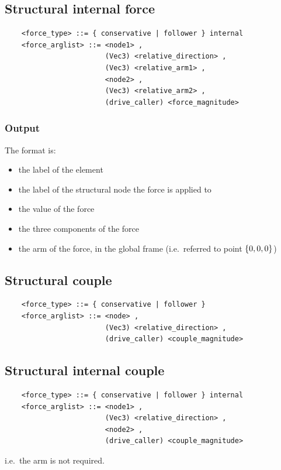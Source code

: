 \subsection{Structural internal force}
\begin{verbatim}
    <force_type> ::= { conservative | follower } internal
    <force_arglist> ::= <node1> , 
                        (Vec3) <relative_direction> ,
                        (Vec3) <relative_arm1> ,
                        <node2> ,
                        (Vec3) <relative_arm2> ,
                        (drive_caller) <force_magnitude>
\end{verbatim}

\subsubsection{Output}
The format is:
\begin{itemize}
    \item the label of the element
    \item the label of the structural node the force is applied to
    \item the value of the force
    \item the three components of the force
    \item the arm of the force, in the global frame (i.e.\ referred
          to point $ \left\{ 0,0,0 \right\} $)
\end{itemize}


\subsection{Structural couple}
\begin{verbatim}
    <force_type> ::= { conservative | follower } 
    <force_arglist> ::= <node> ,
                        (Vec3) <relative_direction> ,  
                        (drive_caller) <couple_magnitude>
\end{verbatim}

\subsection{Structural internal couple}
\begin{verbatim}
    <force_type> ::= { conservative | follower } internal
    <force_arglist> ::= <node1> ,
                        (Vec3) <relative_direction> ,  
                        <node2> ,
                        (drive_caller) <couple_magnitude>
\end{verbatim}
i.e.\ the arm is not required. 

